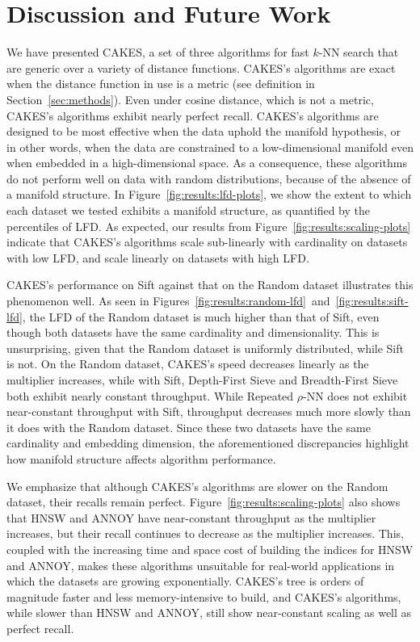 \section{Discussion and Future Work}
\label{sec:discussion-and-future-work}

We have presented CAKES, a set of three algorithms for fast $k$-NN search that are generic over a variety of distance functions.
CAKES's algorithms are exact when the distance function in use is a metric (see definition in Section~\ref{sec:methods}).
Even under cosine distance, which is not a metric, CAKES's algorithms exhibit nearly perfect recall.
CAKES's algorithms are designed to be most effective when the data uphold the manifold hypothesis, or in other words, when the data are constrained to a low-dimensional manifold even when embedded in a high-dimensional space.
As a consequence, these algorithms do not perform well on data with random distributions, because of the absence of a manifold structure.
In Figure~\ref{fig:results:lfd-plots}, we show the extent to which each dataset we tested exhibits a manifold structure, as quantified by the percentiles of LFD.
As expected, our results from Figure~\ref{fig:results:scaling-plots} indicate that CAKES's algorithms scale sub-linearly with cardinality on datasets with low LFD, and scale linearly on datasets with high LFD.

CAKES's performance on Sift against that on the Random dataset illustrates this phenomenon well. As seen in Figures~\ref{fig:results:random-lfd}~and~\ref{fig:results:sift-lfd}, the LFD of the Random dataset is much higher than that of Sift, even though both datasets have the same cardinality and dimensionality.
This is unsurprising, given that the Random dataset is uniformly distributed, while Sift is not.
On the Random dataset, CAKES's speed decreases linearly as the multiplier increases, while with Sift, Depth-First Sieve and Breadth-First Sieve both exhibit nearly constant throughput.
While Repeated $\rho$-NN does not exhibit near-constant throughput with Sift, throughput decreases much more slowly than it does with the Random dataset.
Since these two datasets have the same cardinality and embedding dimension, the aforementioned discrepancies highlight how manifold structure affects algorithm performance.


We emphasize that although CAKES's algorithms are slower on the Random dataset, their recalls remain perfect.
Figure~\ref{fig:results:scaling-plots} also shows that HNSW and ANNOY have near-constant throughput as the multiplier increases, but their recall continues to decrease as the multiplier increases.
This, coupled with the increasing time and space cost of building the indices for HNSW and ANNOY, makes these algorithms unsuitable for real-world applications in which the datasets are growing exponentially.
CAKES's tree is orders of magnitude faster and less memory-intensive to build, and CAKES's algorithms, while slower than HNSW and ANNOY, still show near-constant scaling as well as perfect recall.

